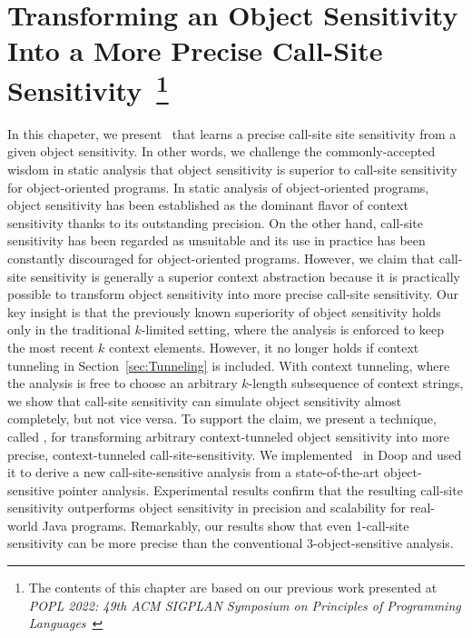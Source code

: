 \chapter{Transforming an Object Sensitivity Into a More Precise Call-Site Sensitivity~\footnote{The contents of this chapter are based on our previous work presented at \emph{POPL 2022: 49th ACM SIGPLAN Symposium on Principles of Programming Languages}~\cite{JeOh22}}}\label{sec:Obj2CFA}


In this chapeter, we present \ourtechnique~that 
learns a precise call-site site sensitivity from a given object sensitivity.
In other words, we challenge the commonly-accepted wisdom in static analysis 
that object sensitivity is superior to call-site sensitivity for object-oriented programs. 
In static analysis of object-oriented programs, object sensitivity
has been established as the dominant flavor of context sensitivity
thanks to its outstanding precision. On the other hand, call-site
sensitivity has been regarded as unsuitable and its use in practice has been 
constantly discouraged for object-oriented programs. 
However, we claim that call-site sensitivity is generally 
a superior context abstraction because it is practically possible to transform 
object sensitivity into more precise call-site sensitivity. 
Our key
insight is that the previously known superiority of object sensitivity holds only
in the traditional $k$-limited setting, where the analysis is enforced
to keep the most recent $k$ context elements. However, it no longer holds if context tunneling in Section~{\ref{sec:Tunneling}} is included.
With context tunneling, where the analysis is free to choose an
arbitrary $k$-length subsequence of context strings, we show that
call-site sensitivity can simulate object sensitivity almost
completely, but not vice versa. To support the claim, we present a
technique, called \ourtechnique, for transforming 
arbitrary context-tunneled object sensitivity into
more precise, context-tunneled call-site-sensitivity.
We implemented \ourtechnique~in Doop and used it to derive a
new call-site-sensitive analysis from a state-of-the-art object-sensitive pointer analysis. 
Experimental results
 confirm that the resulting call-site sensitivity outperforms 
 object sensitivity in precision and scalability for real-world Java programs. 
Remarkably, our results show that even 1-call-site sensitivity can be more precise than the
conventional 3-object-sensitive analysis.









